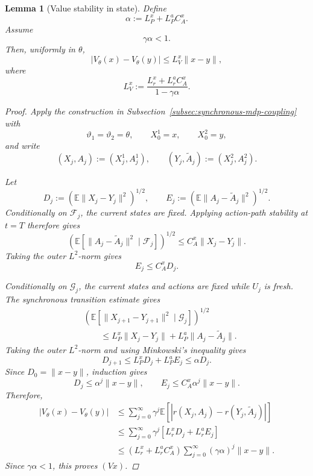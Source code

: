 \documentclass{article}
\newtheorem{lem}[thm]{Lemma}
\theoremstyle{definition}
\theoremstyle{remark}
\theoremstyle{mystyle}
\newcommand{\1}{\mathbbm{1}}
\begin{document}
\begin{lem}[Value stability in state]
Define
\[
\alpha:=L_P^x+L_P^aC_A^x.
\]
Assume
\[
\gamma\alpha<1.
\tag{C}
\]
Then, uniformly in \(\theta\),
\[
|V_\theta(x)-V_\theta(y)|
\le
L_V^x\|x-y\|,
\tag{Vx}
\]
where
\[
L_V^x
:=
\frac{L_r^x+L_r^aC_A^x}{1-\gamma\alpha}.
\]

\begin{proof}
Apply the construction in
Subsection~\ref{subsec:synchronous-mdp-coupling} with
\[
\vartheta_1=\vartheta_2=\theta,
\qquad
X_0^1=x,
\qquad
X_0^2=y,
\]
and write
\[
(X_j,A_j):=(X_j^1,A_j^1),
\qquad
(Y_j,\widetilde A_j):=(X_j^2,A_j^2).
\]

Let
\[
D_j:=\left(\mathbb E\|X_j-Y_j\|^2\right)^{1/2},
\qquad
E_j:=\left(\mathbb E\|A_j-\widetilde A_j\|^2\right)^{1/2}.
\]
Conditionally on \(\mathcal F_j\), the current states are fixed.
Applying action-path stability at \(t=T\) therefore gives
\[
\left(
\mathbb E\left[
\|A_j-\widetilde A_j\|^2
\mid\mathcal F_j
\right]
\right)^{1/2}
\le
C_A^x\|X_j-Y_j\|.
\]
Taking the outer \(L^2\)-norm gives
\[
E_j\le C_A^xD_j.
\]

Conditionally on \(\mathcal G_j\), the current states and actions are
fixed while \(U_j\) is fresh. The synchronous transition estimate gives
\[
\begin{aligned}
&\left(
\mathbb E\left[
\|X_{j+1}-Y_{j+1}\|^2
\mid\mathcal G_j
\right]
\right)^{1/2}
\\
&\qquad\le
L_P^x\|X_j-Y_j\|
+
L_P^a\|A_j-\widetilde A_j\|.
\end{aligned}
\]
Taking the outer \(L^2\)-norm and using Minkowski's inequality gives
\[
D_{j+1}
\le
L_P^xD_j+L_P^aE_j
\le
\alpha D_j.
\]
Since \(D_0=\|x-y\|\), induction gives
\[
D_j\le \alpha^j\|x-y\|,
\qquad
E_j\le C_A^x\alpha^j\|x-y\|.
\]
Therefore,
\[
\begin{aligned}
|V_\theta(x)-V_\theta(y)|
&\le
\sum_{j=0}^{\infty}
\gamma^j
\mathbb E
\left[
|r(X_j,A_j)-r(Y_j,\widetilde A_j)|
\right]
\\
&\le
\sum_{j=0}^{\infty}
\gamma^j
\left[
L_r^xD_j+L_r^aE_j
\right]
\\
&\le
(L_r^x+L_r^aC_A^x)
\sum_{j=0}^{\infty}
(\gamma\alpha)^j
\|x-y\|.
\end{aligned}
\]
Since \(\gamma\alpha<1\), this proves \((Vx)\).
\end{proof}
\end{lem}
\end{document}
